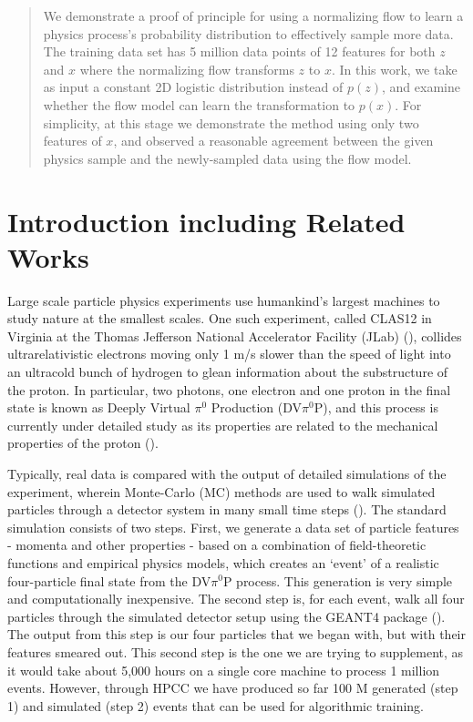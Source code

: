 \begin{abstract}
We demonstrate a proof of principle for using a normalizing flow to learn a physics process's probability distribution to effectively sample more data. The training data set has 5 million data points of 12 features for both $z$ and $x$ where the normalizing flow transforms $z$ to $x$. In this work, we take as input a constant 2D logistic distribution instead of $p(z)$, and examine whether the flow model can learn the transformation to $p(x)$. For simplicity, at this stage we demonstrate the method using only two features of $x$, and observed a reasonable agreement between the given physics sample and the newly-sampled data using the flow model.
\end{abstract}
\section{Introduction including Related Works }

Large scale particle physics experiments use humankind's largest machines to study nature at the smallest scales. One such experiment, called CLAS12 in Virginia at the Thomas Jefferson National Accelerator Facility (JLab) (\citet{BURKERT2020163419}), collides ultrarelativistic electrons moving only 1 m/s slower than the speed of light into an ultracold bunch of hydrogen to glean information about the substructure of the proton. In particular, two photons, one electron and one proton in the final state is known as Deeply Virtual $\pi^0$ Production (DV$\pi^0$P), and this process is currently under detailed study as its properties are related to the mechanical properties of the proton (\citet{PhysRevD.55.7114}).

Typically, real data is compared with the output of detailed simulations of the experiment, wherein Monte-Carlo (MC) methods are used to walk simulated particles through a detector system in many small time steps (\citet{PhysRevLett.115.212003, 10.1093/ptep/ptaa104}). The standard simulation consists of two steps. First, we generate a data set of particle features - momenta and other properties - based on a combination of field-theoretic functions and empirical physics models, which creates an `event' of a realistic four-particle final state from the DV$\pi^0$P process. This generation is very simple and computationally inexpensive. The second step is, for each event, walk all four particles through the simulated detector setup using the GEANT4 package (\citet{AGOSTINELLI2003250}). The output from this step is our four particles that we began with, but with their features smeared out. This second step is the one we are trying to supplement, as it would take about 5,000 hours on a single core machine to process 1 million events. However, through HPCC we have produced so far 100 M generated (step 1) and simulated (step 2) events that can be used for algorithmic training. 

